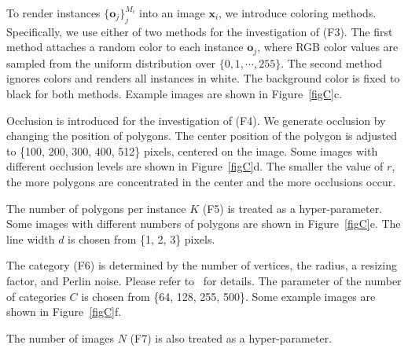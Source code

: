 \documentclass[10pt,twocolumn,letterpaper]{article}
\begin{document}
To render instances $\{\bm{o}_{j}\}_{j}^{M_{i}}$ into an image $\bm{x}_{i}$,
we introduce coloring methods.
Specifically, we use either of two methods for the investigation of (F3).
The first method attaches a random color to each instance $\bm{o}_{j}$, where RGB color values are sampled from the uniform distribution over $\{0, 1, \cdots, 255\}$.
The second method ignores colors and renders all instances in white. The background color is fixed to black for both methods. Example images are shown in Figure~\ref{figC}c.

Occlusion is introduced for the investigation of (F4). We generate occlusion by changing the position of polygons. The center position of the polygon is adjusted to \{100, 200, 300, 400, 512\} pixels, centered on the image. Some images with different occlusion levels are shown in Figure~\ref{figC}d. The smaller the value of $r$, the more polygons are concentrated in the center and the more occlusions occur.

 The number of polygons per instance $K$ (F5) is treated as a hyper-parameter. Some images with different numbers of polygons are shown in Figure~\ref{figC}e. The line width $d$ is chosen from \{1, 2, 3\} pixels.

The category (F6) is determined by the number of vertices, the radius, a resizing factor, and Perlin noise. Please refer
to~\cite{Kataoka_2022_CVPR} for details. The parameter of the number of categories $C$ is chosen from  \{64, 128, 255, 500\}. Some example images are shown in Figure~\ref{figC}f.

The number of images $N$ (F7) is also treated as a hyper-parameter. 

\def\figD{
\begin{figure}[t]
\centering
\texttt{[image: figD.pdf]}
\caption{{\bf Number of instances and mask types.} These experiments are related to factors (F1) and (F2).}
\label{figD}
\vspace{-15pt}
\end{figure}
}

\def\figE{
\begin{figure}
\centering
\texttt{[image: figE.pdf]}
\caption{{\bf mIoU transition during fine-tuning on Cityscapes.}}
\label{figE}
\vspace{-15pt}
\end{figure}
}
\end{document}
